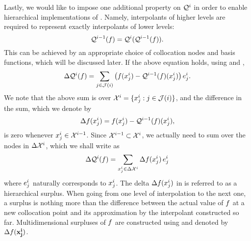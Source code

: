 Lastly, we would like to impose one additional property on $\mathcal{Q}^{i}$ in order
to enable hierarchical implementations of . Namely,
interpolants of higher levels are required to represent exactly interpolants of
lower levels:
\begin{equation} \elab{tensor-exactness}
  \tensor{i - 1}(\f) = \tensor{i}(\tensor{i - 1}(\f)).
\end{equation}
This can be achieved by an appropriate choice of collocation nodes and basis
functions, which will be discussed later. If the above equation holds, using
 and ,
\[
  \Delta\mathcal{Q}^{i}(f) = \sum_{j \in \mathcal{J}(i)} \left(f(x^i_j) - \mathcal{Q}^{i - 1}(f)(x^i_j)\right) e^i_j.
\]
We note that the above sum is over $\mathcal{X}^i = \{ x^i_j: j \in \mathcal{J}(i) \}$, and
the difference in the sum, which we denote by
\begin{equation} \elab{surplus}
  \surplus(\x^i_j) = \f(\x^i_j) - \tensor{i - 1}(\f)(\x^i_j),
\end{equation}
is zero whenever $x^i_j \in \mathcal{X}^{i - 1}$. Since $\mathcal{X}^{i - 1} \subset \mathcal{X}^i$, we
actually need to sum over the nodes in $\Delta\mathcal{X}^i$, which we shall write as
\begin{equation} \elab{tensor-surplus-1d}
  \Delta\tensor{i}(\f) = \sum_{\x^i_j \in \Delta\X^i} \surplus(\x^i_j) \, \e^i_j
\end{equation}
where $e^i_j$ naturally corresponds to $x^i_j$. The delta $\Delta f(x^i_j)$
in  is referred to as a hierarchical surplus. When going from one
level of interpolation to the next one, a surplus is nothing more than the
difference between the actual value of $f$ at a new collocation point and its
approximation by the interpolant constructed so far. Multidimensional surpluses
of $f$ are constructed using  and 
denoted by $\Delta f(\mathbf{x}^{\mathbf{i}}_{\mathbf{j}})$.
